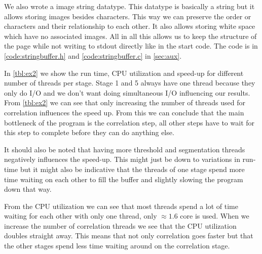 \documentclass[a4paper]{article}
\begin{document}


We also wrote a image string datatype. This datatype is basically a string but it allows storing images besides characters. This way we can preserve the order or characters and their relationship to each other. It also allows storing white space which have no associated images. All in all this allows us to keep the structure of the page while not writing to stdout directly like in the start code. The code is in \autoref{code:stringbuffer.h} and \autoref{code:stringbuffer.c} in \autoref{sec:aux}.

In \autoref{tbl:ex2} we show the run time, CPU utilization and speed-up for different number of threads per stage. Stage 1 and 5 always have one thread because they only do I/O and we don't want doing simultaneous I/O influencing our results. From \autoref{tbl:ex2} we can see that only increasing the number of threads used for correlation influences the speed up. From this we can conclude that the main bottleneck of the program is the correlation step, all other steps have to wait for this step to complete before they can do anything else.

It should also be noted that having more threshold and segmentation threads negatively influences the speed-up. This might just be down to variations in run-time but it might also be indicative that the threads of one stage spend more time waiting on each other to fill the buffer and slightly slowing the program down that way.

From the CPU utilization we can see that most threads spend a lot of time waiting for each other with only one thread, only $\approx 1.6$ core is used. When we increase the number of correlation threads we see that the CPU utilization doubles straight away. This means that not only correlation goes faster but that the other stages spend less time waiting around on the correlation stage.
\end{document}
